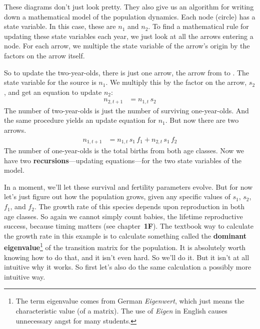 \documentclass[10pt,reqno]{amsbook}
\newcommand{\bemph}[1]{{\textbf{\textcolor{bemphcol}{#1}}}}
\newcommand{\nodeinline}[1]{%
	\hspace{-2pt}\raisebox{-2.7pt}{
	\begin{tikzpicture} \tikzstyle{every state}=[
        draw = black,
        thick,
        fill = white,
        	inner sep = 0.5mm,
			minimum size = 0.8mm,
			scale = 0.8
    ] \node[state] (x) {#1}; \end{tikzpicture}
    }\hspace{-2pt}%
}
\numberwithin{equation}{chapter}
\begin{document}
These diagrams don't just look pretty. They also give us an algorithm for writing down a mathematical model of the population dynamics. Each node (circle) has a state variable. In this case, these are $n_1$ and $n_2$. To find a mathematical rule for updating these state variables each year, we just look at all the arrows entering a node. For each arrow, we multiple the state variable of the arrow's origin by the factors on the arrow itself. 

So to update the two-year-olds, there is just one arrow, the arrow from \nodeinline{$1$} to \nodeinline{$2$}. The state variable for the source \nodeinline{$1$} is $n_1$. We multiply this by the factor on the arrow, $s_2$, and get an equation to update $n_2$:
\begin{align*}
	 n_{2,t+1} &= n_{1,t} \, s_2 
\end{align*}
The number of two-year-olds is just the number of surviving one-year-olds. 
And the same procedure yields an update equation for $n_1$. But now there are two arrows. 
\begin{align*}
	 n_{1,t+1} &= n_{1,t} \, s_1 \, f_1   + n_{2,t} \, s_1 \, f_2  
\end{align*}
The number of one-year-olds is the total births from both age classes. Now we have two \bemph{recursions}---updating equations---for the two state variables of the model.

In a moment, we'll let these survival and fertility parameters evolve. But for now let's just figure out how the population grows, given any specific values of $s_1$, $s_2$, $f_1$, and $f_2$. 
The growth rate of this species depends upon reproduction in both age classes. So again we cannot simply count babies, the lifetime reproductive success, because timing matters (see chapter~\bemph{1F}). The textbook way to calculate the growth rate in this example is to calculate something called the \bemph{dominant eigenvalue}\footnote{The term eigenvalue comes from German \emph{Eigenwert}, which just means the characteristic value (of a matrix). The use of \emph{Eigen} in English causes unnecessary angst for many students.} of the transition matrix for the population. It is absolutely worth knowing how to do that, and it isn't even hard. So we'll do it. But it isn't at all intuitive why it works. So first let's also do the same calculation a possibly more intuitive way.
\end{document}
